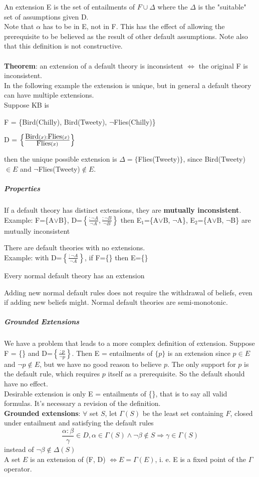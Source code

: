 \documentclass[10pt]{report}
\begin{document}
An extension E is the set of entailments of $F\cup\Delta$ where the $\Delta$ is the "suitable" set of assumptions given D.\\
Note that $\alpha$ has to be in E, not in F. This has the effect of allowing the prerequisite to be believed as the result of other default assumptions. Note also that this definition is not constructive.\\\\
\textbf{Theorem}: an extension of a default theory is inconsistent $\Leftrightarrow$ the original F is inconsistent.\\
In the following example the extension is unique, but in general a default theory can have multiple extensions.\\
Suppose KB is 
\begin{list}{}{}
	\item F = \{Bird(Chilly), Bird(Tweety), $\neg$Flies(Chilly)\}
	\item D = $\left\{\frac{\hbox{Bird}(x) : \hbox{Flies}(x)}{\hbox{Flies}(x)}\right\}$
\end{list}
then the unique possible extension is $\Delta = \{$Flies(Tweety)$\}$, since Bird(Tweety)$\in E$ and $\neg$Flies(Tweety)$\not\in E$.
\subparagraph{Properties} \begin{list}{}{}
	\item If a default theory has distinct extensions, they are \textbf{mutually inconsistent}.\\
	Example: F=\{A$\vee$B\}, D=$\left\{\frac{:\neg A}{\neg A}, \frac{:\neg B}{\neg B}\right\}$ then E$_1$=\{A$\vee$B, $\neg$A\}, E$_2$=\{A$\vee$B, $\neg$B\} are mutually inconsistent
	\item There are default theories with no extensions.\\
	Example: with D=$\left\{\frac{:\neg A}{\neg A}\right\}$, if F=\{\} then E=\{\}
	\item Every normal default theory has an extension
	\item Adding new normal default rules does not require the withdrawal of beliefs, even if adding new beliefs might. Normal default theories are semi-monotonic.
\end{list}
\subparagraph{Grounded Extensions} We have a problem that leads to a more complex definition of extension. Suppose F = \{\} and D=$\left\{\frac{:p}{\neg p}\right\}$. Then E = entailments of $\{p\}$ is an extension since $p\in E$ and $\neg p\not\in E$, but we have no good reason to believe $p$. The only support for $p$ is the default rule, which requires $p$ itself as a prerequisite. So the default should have no effect.\\
Desirable extension is only E = entailments of \{\}, that is to say all valid formulas. It's necessary a revision of the definition.\\
\textbf{Grounded extensions}: $\forall$ set $S$, let $\Gamma(S)$ be the least set containing $F$, closed under entailment and satisfying the default rules $$\frac{\alpha : \beta}{\gamma} \in D, \alpha\in \Gamma(S) \wedge \neg\beta\not\in S \Rightarrow \gamma\in \Gamma(S)$$
instead of $\neg\beta\not\in\Delta(S)$\\
A set $E$ is an extension of (F, D) $\Leftrightarrow E = \Gamma(E)$, i. e. E is a fixed point of the $\Gamma$ operator.
\end{document}
